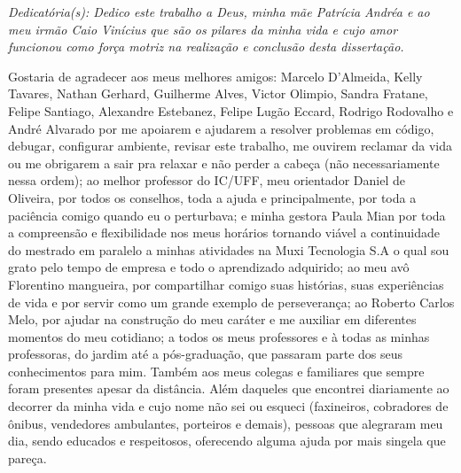 \cleardoublepage
\thispagestyle{empty}
\vspace*{200mm}

\begin{flushright}
{\em 
Dedicatória(s): Dedico este trabalho a Deus, minha mãe Patrícia Andréa e ao meu irmão Caio Vinícius que são os pilares da minha vida e cujo amor funcionou como força motriz na realização e conclusão desta dissertação.
}
\end{flushright}
\newpage


\hspace{5mm}
Gostaria de agradecer aos meus melhores amigos: Marcelo D'Almeida, Kelly Tavares, Nathan Gerhard, Guilherme Alves, Victor Olimpio, Sandra Fratane, Felipe Santiago, Alexandre Estebanez, Felipe Lugão Eccard, Rodrigo Rodovalho e André Alvarado por me apoiarem e ajudarem a resolver problemas em código, debugar, configurar ambiente, revisar este trabalho, me ouvirem reclamar da vida ou me obrigarem a sair pra relaxar e não perder a cabeça (não necessariamente nessa ordem); ao melhor professor do IC/UFF, meu orientador Daniel de Oliveira, por todos os conselhos, toda a ajuda e principalmente, por toda a paciência comigo quando eu o perturbava; e minha gestora Paula Mian por toda a compreensão e flexibilidade nos meus horários tornando viável a continuidade do mestrado em paralelo a minhas atividades na Muxi Tecnologia S.A o qual sou grato pelo tempo de empresa e todo o aprendizado adquirido; ao meu avô Florentino mangueira, por compartilhar comigo suas histórias, suas experiências de vida e por servir como um grande exemplo de perseverança; ao Roberto Carlos Melo, por ajudar na construção do meu caráter e me auxiliar em diferentes momentos do meu cotidiano; a todos os meus professores e à todas as minhas professoras, do jardim até a pós-graduação, que passaram parte dos seus conhecimentos para mim. Também aos meus colegas e familiares que sempre foram presentes apesar da distância. Além daqueles que encontrei diariamente ao decorrer da minha vida e cujo nome não sei ou esqueci (faxineiros, cobradores de ônibus, vendedores ambulantes, porteiros e demais), pessoas que alegraram meu dia, sendo educados e respeitosos, oferecendo alguma ajuda por mais singela que pareça.


